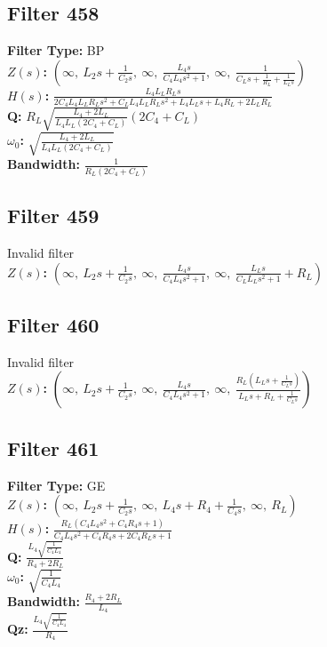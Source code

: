 \documentclass{article}
\begin{document}
\subsection*{Filter 458}
\textbf{Filter Type:} BP \\ 
\textbf{$Z(s)$:} $\left( \infty, \  L_{2} s + \frac{1}{C_{2} s}, \  \infty, \  \frac{L_{4} s}{C_{4} L_{4} s^{2} + 1}, \  \infty, \  \frac{1}{C_{L} s + \frac{1}{R_{L}} + \frac{1}{L_{L} s}}\right)$ \\ 
\textbf{$H(s)$:} $\frac{L_{4} L_{L} R_{L} s}{2 C_{4} L_{4} L_{L} R_{L} s^{2} + C_{L} L_{4} L_{L} R_{L} s^{2} + L_{4} L_{L} s + L_{4} R_{L} + 2 L_{L} R_{L}}$ \\ 
\textbf{Q:} $R_{L} \sqrt{\frac{L_{4} + 2 L_{L}}{L_{4} L_{L} \left(2 C_{4} + C_{L}\right)}} \left(2 C_{4} + C_{L}\right)$ \\ 
\textbf{$\omega_0$:} $\sqrt{\frac{L_{4} + 2 L_{L}}{L_{4} L_{L} \left(2 C_{4} + C_{L}\right)}}$ \\ 
\textbf{Bandwidth:} $\frac{1}{R_{L} \left(2 C_{4} + C_{L}\right)}$ \\ 
\subsection*{Filter 459}
Invalid filter \\ 
\textbf{$Z(s)$:} $\left( \infty, \  L_{2} s + \frac{1}{C_{2} s}, \  \infty, \  \frac{L_{4} s}{C_{4} L_{4} s^{2} + 1}, \  \infty, \  \frac{L_{L} s}{C_{L} L_{L} s^{2} + 1} + R_{L}\right)$ \\ 
\subsection*{Filter 460}
Invalid filter \\ 
\textbf{$Z(s)$:} $\left( \infty, \  L_{2} s + \frac{1}{C_{2} s}, \  \infty, \  \frac{L_{4} s}{C_{4} L_{4} s^{2} + 1}, \  \infty, \  \frac{R_{L} \left(L_{L} s + \frac{1}{C_{L} s}\right)}{L_{L} s + R_{L} + \frac{1}{C_{L} s}}\right)$ \\ 
\subsection*{Filter 461}
\textbf{Filter Type:} GE \\ 
\textbf{$Z(s)$:} $\left( \infty, \  L_{2} s + \frac{1}{C_{2} s}, \  \infty, \  L_{4} s + R_{4} + \frac{1}{C_{4} s}, \  \infty, \  R_{L}\right)$ \\ 
\textbf{$H(s)$:} $\frac{R_{L} \left(C_{4} L_{4} s^{2} + C_{4} R_{4} s + 1\right)}{C_{4} L_{4} s^{2} + C_{4} R_{4} s + 2 C_{4} R_{L} s + 1}$ \\ 
\textbf{Q:} $\frac{L_{4} \sqrt{\frac{1}{C_{4} L_{4}}}}{R_{4} + 2 R_{L}}$ \\ 
\textbf{$\omega_0$:} $\sqrt{\frac{1}{C_{4} L_{4}}}$ \\ 
\textbf{Bandwidth:} $\frac{R_{4} + 2 R_{L}}{L_{4}}$ \\ 
\textbf{Qz:} $\frac{L_{4} \sqrt{\frac{1}{C_{4} L_{4}}}}{R_{4}}$ \\ 
\end{document}

